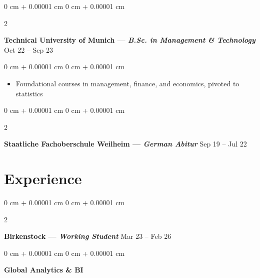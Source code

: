 \documentclass[10pt, letterpaper]{article}
\newenvironment{highlights}{
    \setlength{\leftmargini}{2em}
    \begin{itemize}[
        topsep=0.10 cm,
        parsep=0.10 cm,
        partopsep=0pt,
        itemsep=0pt,
        leftmargin=2em
    ]
}{
    \end{itemize}
} %
\newenvironment{onecolentry}{
    \begin{adjustwidth}{
        0 cm + 0.00001 cm
    }{
        0 cm + 0.00001 cm
    }
}{
    \end{adjustwidth}
} %
\newenvironment{twocolentry}[2][]{
    \onecolentry
    \def\secondColumn{#2}
    \setcolumnwidth{\fill, 4.5 cm}
    \begin{paracol}{2}
}{
    \switchcolumn \raggedleft \secondColumn
    \end{paracol}
    \endonecolentry
} %
\begin{document}
        \vspace{0.2 cm}

        \begin{twocolentry}{
            Oct 22 – Sep 23
        }
            \textbf{Technical University of Munich — \textit{B.Sc. in Management \& Technology}}\end{twocolentry}

        \vspace{0.05 cm}
        \begin{onecolentry}
            \begin{highlights}
                \item Foundational courses in management, finance, and economics, pivoted to statistics
            \end{highlights}
        \end{onecolentry}

        \vspace{0.2 cm}

        \begin{twocolentry}{
            Sep 19 – Jul 22
        }
            \textbf{Staatliche Fachoberschule Weilheim — \textit{German Abitur}}\end{twocolentry}



    
    \section{Experience}

        \begin{twocolentry}{
            Mar 23 – Feb 26
        }
            \textbf{Birkenstock — \textit{Working Student}}\end{twocolentry}

        \vspace{0.10 cm}
        \begin{onecolentry}
            \hspace{0.3cm}\textbf{Global Analytics \& BI}
        \end{onecolentry}
\end{document}
